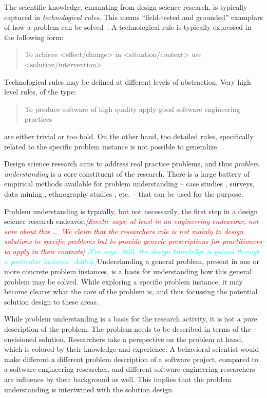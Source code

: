 \documentclass[graybox]{svmult}
\newcommand{\emelie}[1]{\textcolor{red}{{\it [Emelie says: #1]}}}
\newcommand{\per}[1]{\textcolor{cyan}{{\it [Per says: #1]}}}
\newcommand{\emelie}[1]{}
\newcommand{\per}[1]{}
\begin{document}
The scientific knowledge, emanating from design science research, is typically captured in \emph{technological rules}. This means ``field-tested and grounded'' examplars of how a problem can be solved~\cite{van_aken_management_2004}. A technological rule is typically expressed in the following form: 

\begin{quote}{To achieve <effect/change> in <situation/context> use <solution/intervention>}\end{quote}


Technological rules may be defined at different levels of abstraction. Very high level rules, of the type:
\begin{quote}{To produce software of high quality apply good software engineering practices}\end{quote} are either trivial or too bold. On the other hand, too detailed rules, specifically related to the specific problem instance is not possible to generalize.

Design science research aims to address real practice problems, and thus \emph{problem understanding} is a core constituent of the research. There is a large battery of empirical methods available for problem understanding -- case studies \cite{Runeson12Case}, surveys, data mining \cite{MenziesDataMining2016}, ethnography studies \cite{SharpEthnography2016}, etc. -- that can be used for the purpose.

Problem understanding is typically, but not necessarily, the first step in a design science research endeavor.\emelie{at least in an engineering endeavour, not sure about this ... We claim that the researchers role is not mainly to design solutions to specific problems but to provide generic prescriptions for practitioners to apply in their contexts} \per{Still, the design knowledge is gained through a particular instance. Added:}Understanding a general problem, present in one or more concrete problem instances, is a basis for understanding how this general problem may be solved.  While exploring a specific problem instance,   it may become clearer what the core of the problem is, and thus focussing the potential solution design to these areas. 

While problem understanding is a basis for the research activity, it is not a pure description of the problem. The problem needs to be described in terms of the envisioned solution. Researchers take a perspective on the problem at hand, which is colored by their knowledge and experience. A behavioral scientist would make different a different problem description of a software project, compared to a software engineering researcher, and different software engineering researchers are influence by their background as well. This implies that the problem understanding is intertwined with the solution design.
\end{document}
